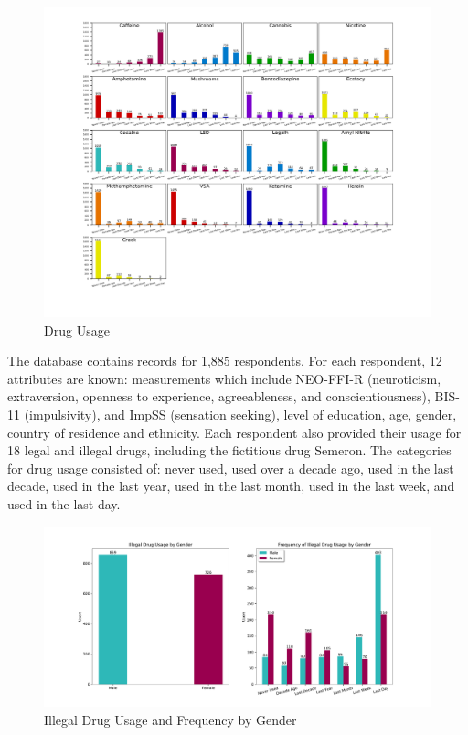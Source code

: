 \documentclass[10pt]{article}
\begin{document}
\begin{figure}[h]
\caption{Drug Usage}
\centering
\includegraphics[scale=0.7]{drugs.png}
\end{figure}

The database contains records for 1,885 respondents. For each respondent, 12 attributes are known: measurements which include NEO-FFI-R (neuroticism, extraversion, openness to experience, agreeableness, and conscientiousness), BIS-11 (impulsivity), and ImpSS (sensation seeking), level of education, age, gender, country of residence and ethnicity. Each respondent also provided their usage for 18 legal and illegal drugs, including the fictitious drug Semeron. The categories for drug usage consisted of: never used, used over a decade ago, used in the last decade, used in the last year, used in the last month, used in the last week, and used in the last day.

\begin{figure}[H]
\caption{Illegal Drug Usage and Frequency by Gender}
\centering
\includegraphics[scale=0.4]{gender_freq.png}
\end{figure}
\end{document}
